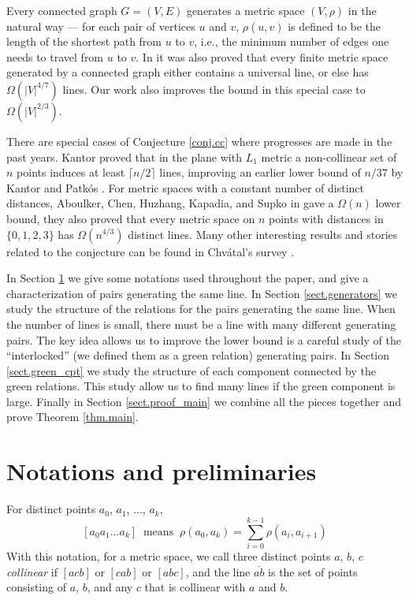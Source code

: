 \documentclass[12pt]{article}
\newcommand{\ov}{\overline}
\begin{document}
Every connected graph $G=(V, E)$ generates a metric space $(V, \rho)$ in the natural way ---
for each pair of vertices $u$ and $v$, $\rho(u, v)$ is defined to be the length of the shortest
path from $u$ to $v$, i.e., the minimum number of edges one needs to travel from $u$ to $v$.
In \cite{ACHKS} it was also proved that every finite metric space generated by 
a connected graph either contains a universal line, or else has $\Omega(|V|^{4/7})$
lines. Our work also improves the bound in this special case to $\Omega(|V|^{2/3})$.

There are special cases of Conjecture \ref{conj.cc} where progresses are made in the
past years. Kantor \cite{K} proved that in the plane with $L_1$ metric
a non-collinear set of $n$ points induces at least $\lceil n/2 \rceil$ lines,
improving an earlier lower bound of $n/37$ by Kantor and Patk\'os \cite{KP}.
For metric spaces with a constant number of distinct distances,
Aboulker, Chen, Huzhang, Kapadia, and Supko in \cite{ACHKS} gave a $\Omega(n)$ lower bound, they also proved that every metric space on $n$ points with distances in 
$\{0, 1, 2, 3\}$ has $\Omega(n^{4/3})$ distinct lines.
Many other interesting results and stories related to the conjecture can be found
in Chv\'atal's survey \cite{C}.

In Section \ref{sect.prelim} we give some notations used throughout the paper,
and give a characterization of pairs generating the same line.
In Section \ref{sect.generators} we study the structure of the relations
for the pairs generating the same line.
When the number of lines is small, there must be a line with many different generating pairs.
The key idea allows us to improve the lower bound is a careful study
of the ``interlocked'' (we defined them as a green relation) generating pairs.
In Section \ref{sect.green_cpt} we study the structure of each component
connected by the green relations. This study allow us to find many lines
if the green component is large.
Finally in Section \ref{sect.proof_main} we combine all the pieces together
and prove Theorem \ref{thm.main}.

\section{Notations and preliminaries}\label{sect.prelim}

For distinct points $a_0$, $a_1$, ..., $a_k$,
\[ [a_0 a_1 ... a_k] \;\;\mbox{means}\;\; \rho(a_0, a_k) = \sum_{i=0}^{k-1} \rho(a_i, a_{i+1}) \]
With this notation, for a metric space, we call three distinct points $a$, $b$, $c$ {\em collinear} if $[acb]$ or $[cab]$ or $[abc]$, and the line $\ov{ab}$ is the set of points consisting of $a$, $b$, and any $c$
that is collinear with $a$ and $b$.
\end{document}
